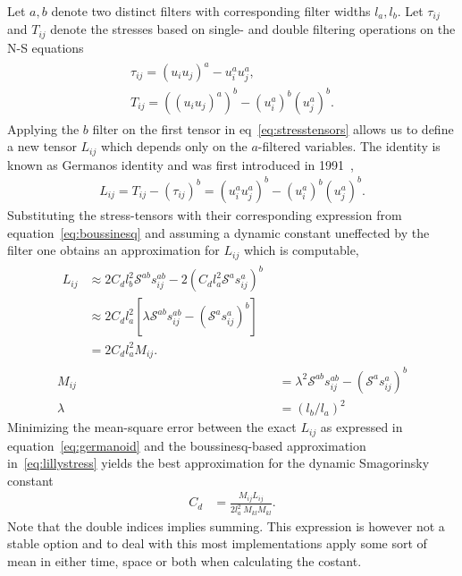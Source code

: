 Let $a,b$ denote two distinct filters with corresponding filter widths $l_a,l_b$. 
Let $\tau_{ij}$ and $T_{ij}$ denote the stresses based on single- and double filtering
operations on the N-S equations
\begin{align}
    \begin{split}
    \tau_{ij} = (u_iu_j)^a - u_i^au_j^a,\\
    T_{ij} = ((u_iu_j)^a)^b - (u_i^a)^b(u_j^a)^b.
    \end{split}
    \label{eq:stresstensors}
\end{align}
Applying the $b$ filter on the first tensor in eq~\ref{eq:stresstensors} allows us to define 
a new tensor $L_{ij}$ which depends only on the $a$-filtered variables. The identity 
is known as Germanos identity and was first introduced in 1991~\cite{Germano91},
\begin{align}
    L_{ij} = T_{ij} - (\tau_{ij})^b
    = (u_i^au_j^a)^b - (u_i^a)^b(u_j^a)^b.
    \label{eq:germanoid}
\end{align}
Substituting the stress-tensors with their corresponding expression 
from equation~\ref{eq:boussinesq} and assuming a dynamic constant uneffected by the filter 
one obtains an approximation for $L_{ij}$ which is computable,
\begin{align}
    \begin{split}
L_{ij} &\approx 2C_d l_b^2 \mathcal{S}^{ab} s^{ab}_{ij}
        -2 (C_d l_a^2 \mathcal{S}^a s^a_{ij})^b\\
        &\approx 2C_dl_a^2[\lambda\mathcal{S}^{ab}s^{ab}_{ij} 
        - (\mathcal{S}^{a}s^{a}_{ij})^b]\\
        &= 2C_dl_a^2 M_{ij}.
        \label{eq:lillystress}
    \end{split} \\
    M_{ij} &= \lambda^{2}\mathcal{S}^{ab}s_{ij}^{ab} - (\mathcal{S}^as_{ij}^a)^b\\
        \lambda &= (l_b/l_a)^2
    \label{eq:dynsmagderivation}
\end{align}
Minimizing the mean-square error between the exact $L_{ij}$ as expressed in 
equation~\ref{eq:germanoid} and the boussinesq-based approximation 
in~\ref{eq:lillystress} yields the best approximation 
for the dynamic Smagorinsky constant 
%
\begin{align}
    C_d &= \frac{M_{ij}L_{ij}}{2l_a^2\:M_{kl}M_{kl}}.
    \label{eq:dynsmag}
\end{align}
%
Note that the double indices implies summing. This expression is however not a 
stable option and to deal with this most implementations apply some sort of mean 
in either time, space or both when calculating the costant.  

